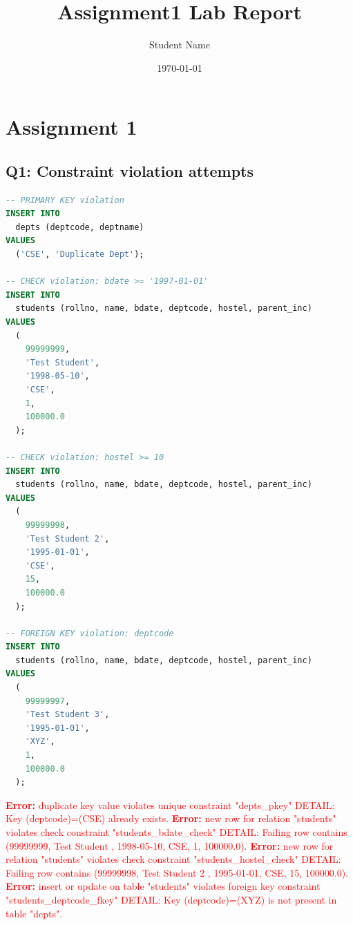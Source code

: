 \documentclass[11pt, a4paper]{article}
\title{Assignment1 Lab Report}
\author{Student Name}
\date{\today}
\begin{document}
\maketitle

\section{Assignment 1}
\subsection*{Q1: Constraint violation attempts}
\begin{lstlisting}[language=SQL]
-- PRIMARY KEY violation
INSERT INTO
  depts (deptcode, deptname)
VALUES
  ('CSE', 'Duplicate Dept');

-- CHECK violation: bdate >= '1997-01-01'
INSERT INTO
  students (rollno, name, bdate, deptcode, hostel, parent_inc)
VALUES
  (
    99999999,
    'Test Student',
    '1998-05-10',
    'CSE',
    1,
    100000.0
  );

-- CHECK violation: hostel >= 10
INSERT INTO
  students (rollno, name, bdate, deptcode, hostel, parent_inc)
VALUES
  (
    99999998,
    'Test Student 2',
    '1995-01-01',
    'CSE',
    15,
    100000.0
  );

-- FOREIGN KEY violation: deptcode
INSERT INTO
  students (rollno, name, bdate, deptcode, hostel, parent_inc)
VALUES
  (
    99999997,
    'Test Student 3',
    '1995-01-01',
    'XYZ',
    1,
    100000.0
  );
\end{lstlisting}
\vspace{0.3cm}
\textcolor{red}{\textbf{Error:} duplicate key value violates unique constraint "depts\_pkey"
DETAIL:  Key (deptcode)=(CSE) already exists.}\vspace{0.2cm}\newline
\textcolor{red}{\textbf{Error:} new row for relation "students" violates check constraint "students\_bdate\_check"
DETAIL:  Failing row contains (99999999, Test Student                  , 1998-05-10, CSE, 1, 100000.0).}\vspace{0.2cm}\newline
\textcolor{red}{\textbf{Error:} new row for relation "students" violates check constraint "students\_hostel\_check"
DETAIL:  Failing row contains (99999998, Test Student 2                , 1995-01-01, CSE, 15, 100000.0).}\vspace{0.2cm}\newline
\textcolor{red}{\textbf{Error:} insert or update on table "students" violates foreign key constraint "students\_deptcode\_fkey"
DETAIL:  Key (deptcode)=(XYZ) is not present in table "depts".}\vspace{0.2cm}
\newpage
\end{document}
